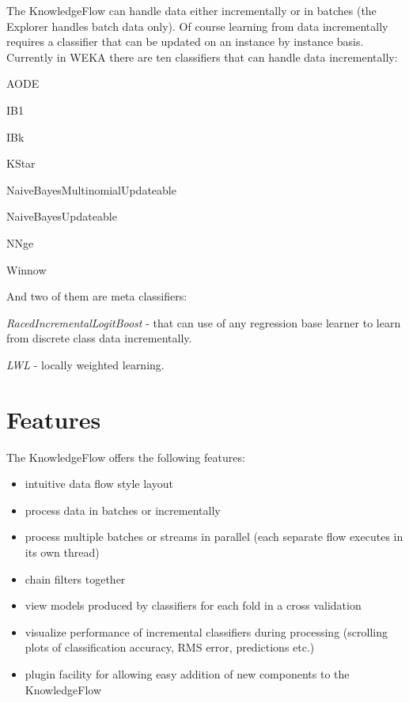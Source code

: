 The KnowledgeFlow can handle data either incrementally or in batches
(the Explorer handles batch data only). Of course learning from data
incrementally requires a classifier that can be updated on an instance
by instance basis. Currently in WEKA there are ten classifiers that
can handle data incrementally:
\begin{tight_itemize}
	\item AODE
	\item IB1
	\item IBk
	\item KStar
	\item NaiveBayesMultinomialUpdateable
	\item NaiveBayesUpdateable
	\item NNge
	\item Winnow
\end{tight_itemize}

\noindent And two of them are meta classifiers:
\begin{tight_itemize}
	\item \textit{RacedIncrementalLogitBoost} - that can use of any regression base
learner to learn from discrete class data incrementally.
	\item \textit{LWL} - locally weighted learning.
\end{tight_itemize}


\newpage
\section{Features}

The KnowledgeFlow offers the following features:
\begin{itemize}
	\item intuitive data flow style layout
	\item process data in batches or incrementally 
	\item process multiple batches or streams in parallel (each separate flow 
  	executes in its own thread)
	\item chain filters together
	\item view models produced by classifiers for each fold in a cross validation
	\item visualize performance of incremental classifiers during 
  	processing (scrolling plots of classification accuracy, RMS error, 
  	predictions etc.)
        \item plugin facility for allowing easy addition of new components
        to the KnowledgeFlow
\end{itemize}

